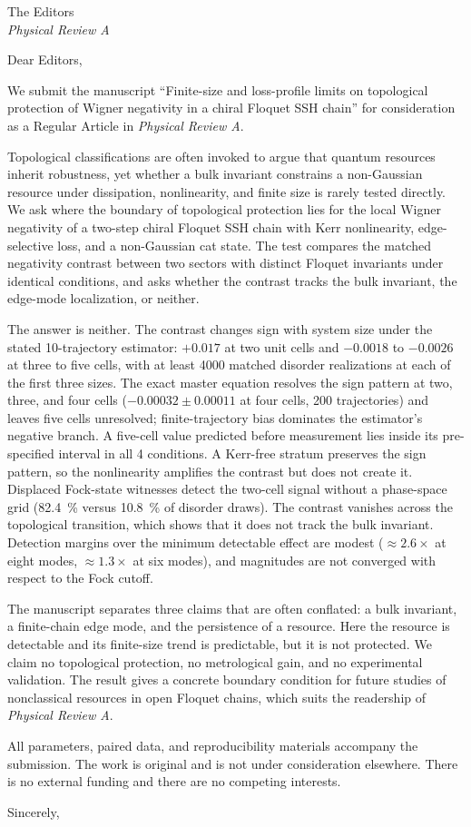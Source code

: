 \documentclass[12pt,a4paper]{letter}
\date{\today}
\begin{document}
\begin{letter}{The Editors\\\textit{Physical Review A}}
\opening{Dear Editors,}

We submit the manuscript ``Finite-size and loss-profile limits on topological protection of Wigner negativity in a chiral Floquet SSH chain'' for consideration as a Regular Article in \textit{Physical Review A}.

Topological classifications are often invoked to argue that quantum resources inherit robustness, yet whether a bulk invariant constrains a non-Gaussian resource under dissipation, nonlinearity, and finite size is rarely tested directly. We ask where the boundary of topological protection lies for the local Wigner negativity of a two-step chiral Floquet SSH chain with Kerr nonlinearity, edge-selective loss, and a non-Gaussian cat state. The test compares the matched negativity contrast between two sectors with distinct Floquet invariants under identical conditions, and asks whether the contrast tracks the bulk invariant, the edge-mode localization, or neither.

The answer is neither. The contrast changes sign with system size under the stated \num{10}-trajectory estimator: $+\num{0.017}$ at two unit cells and $-\num{0.0018}$ to $-\num{0.0026}$ at three to five cells, with at least \num{4000} matched disorder realizations at each of the first three sizes. The exact master equation resolves the sign pattern at two, three, and four cells ($-\num{0.00032}\pm\num{0.00011}$ at four cells, \num{200} trajectories) and leaves five cells unresolved; finite-trajectory bias dominates the estimator's negative branch. A five-cell value predicted before measurement lies inside its pre-specified interval in all \num{4} conditions. A Kerr-free stratum preserves the sign pattern, so the nonlinearity amplifies the contrast but does not create it. Displaced Fock-state witnesses detect the two-cell signal without a phase-space grid (\qty{82.4}{\percent} versus \qty{10.8}{\percent} of disorder draws). The contrast vanishes across the topological transition, which shows that it does not track the bulk invariant. Detection margins over the minimum detectable effect are modest ($\approx\num{2.6}\times$ at eight modes, $\approx\num{1.3}\times$ at six modes), and magnitudes are not converged with respect to the Fock cutoff.

The manuscript separates three claims that are often conflated: a bulk invariant, a finite-chain edge mode, and the persistence of a resource. Here the resource is detectable and its finite-size trend is predictable, but it is not protected. We claim no topological protection, no metrological gain, and no experimental validation. The result gives a concrete boundary condition for future studies of nonclassical resources in open Floquet chains, which suits the readership of \textit{Physical Review A}.

All parameters, paired data, and reproducibility materials accompany the submission. The work is original and is not under consideration elsewhere. There is no external funding and there are no competing interests.

\closing{Sincerely,}
\end{letter}
\end{document}
